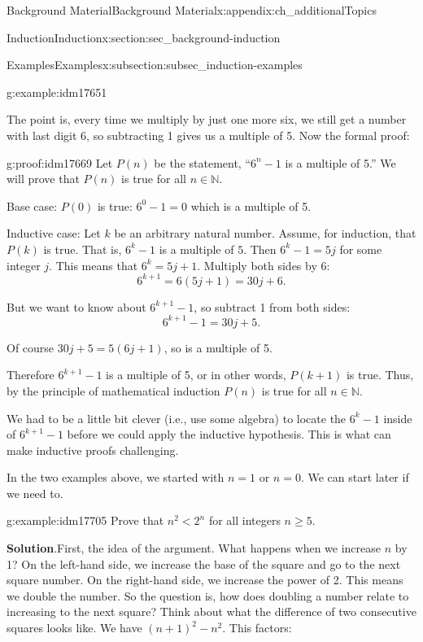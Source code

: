 \documentclass[oneside,10pt,]{book}
\numberwithin{equation}{chapter}
\def\N{\mathbb N}
\newcommand{\lt}{<}
\begin{document}
\begin{appendixptx}{Background Material}{}{Background Material}{}{}{x:appendix:ch_additionalTopics}
\begin{sectionptx}{Induction}{}{Induction}{}{}{x:section:sec_background-induction}
\begin{subsectionptx}{Examples}{}{Examples}{}{}{x:subsection:subsec_induction-examples}
\begin{example}{}{g:example:idm17651}
\par
The point is, every time we multiply by just one more six, we still get a number with last digit 6, so subtracting 1 gives us a multiple of 5. Now the formal proof:%
\begin{proofptx}{}{g:proof:idm17669}
Let \(P(n)\) be the statement, ``\(6^n - 1\) is a multiple of 5.'' We will prove that \(P(n)\) is true for all \(n \in \N\).%
\par
Base case: \(P(0)\) is true: \(6^0 -1 = 0\) which is a multiple of 5.%
\par
Inductive case: Let \(k\) be an arbitrary natural number. Assume, for induction, that \(P(k)\) is true. That is, \(6^k - 1\) is a multiple of \(5\). Then \(6^k - 1 = 5j\) for some integer \(j\). This means that \(6^k = 5j + 1\). Multiply both sides by \(6\):%
\begin{equation*}
6^{k+1} = 6(5j+1) = 30j + 6.
\end{equation*}
%
\par
But we want to know about \(6^{k+1} - 1\), so subtract 1 from both sides:%
\begin{equation*}
6^{k+1} - 1 = 30j + 5.
\end{equation*}
%
\par
Of course \(30j+5 = 5(6j+1)\), so is a multiple of 5.%
\par
Therefore \(6^{k+1} - 1\) is a multiple of 5, or in other words, \(P(k+1)\) is true. Thus, by the principle of mathematical induction \(P(n)\) is true for all \(n \in \N\).%
\end{proofptx}
\end{example}
We had to be a little bit clever (i.e., use some algebra) to locate the \(6^k - 1\) inside of \(6^{k+1} - 1\) before we could apply the inductive hypothesis. This is what can make inductive proofs challenging.%
\par
In the two examples above, we started with \(n = 1\) or \(n = 0\). We can start later if we need to.%
\begin{example}{}{g:example:idm17705}%
Prove that \(n^2 \lt  2^n\) for all integers \(n \ge 5\).%
\par\smallskip%
\noindent\textbf{Solution}.\hypertarget{g:solution:idm17710}{}\quad{}First, the idea of the argument. What happens when we increase \(n\) by 1? On the left-hand side, we increase the base of the square and go to the next square number. On the right-hand side, we increase the power of 2. This means we double the number. So the question is, how does doubling a number relate to increasing to the next square? Think about what the difference of two consecutive squares looks like. We have \((n+1)^2 - n^2\). This factors:%

\end{example}
\end{subsectionptx}
\end{sectionptx}
\end{appendixptx}
\end{document}
